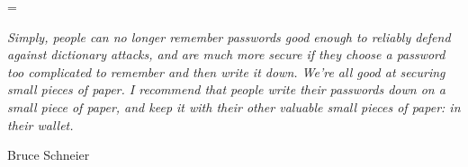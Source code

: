 \newpage

\vspace*{\fill}

\begin{adjustwidth}{0.175in}{0.175in}
\fontsize{9}{11}\selectfont

\emergencystretch=\maxdimen
{}

\textit{Simply, people can no longer remember passwords good enough to reliably defend against dictionary attacks, and are much more secure if they choose a password too complicated to remember and then write it down.
We're all good at securing small pieces of paper. 
I recommend that people write their passwords down on a small piece of paper, and keep it with their other valuable small pieces of paper: in their wallet.}
\par\flushright\textup{Bruce Schneier} %

\end{adjustwidth}
\normalsize

\vspace*{\fill}

